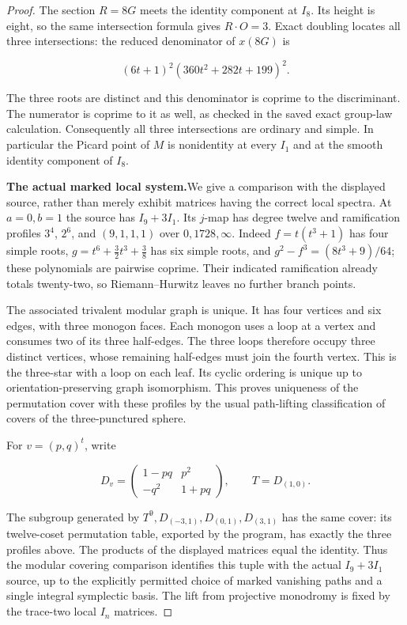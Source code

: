\begin{proof}
The section \(R=8G\) meets the identity component at \(I_8\).
Its height is eight, so the same intersection formula gives
\(R\cdot O=3\).  Exact doubling locates all three intersections:
the reduced denominator of \(x(8G)\) is

\[
 (6t+1)^2(360t^2+282t+199)^2.
\]

The three roots are distinct and this denominator is coprime to
the discriminant.  The numerator is coprime to it as well, as
checked in the saved exact group-law calculation.  Consequently
all three intersections are ordinary and simple.  In particular
the Picard point of \(M\) is nonidentity at every \(I_1\) and
at the smooth identity component of \(I_8\).

\par\medskip\noindent\textbf{The actual marked local system.}\enspace We give a comparison
with the displayed source, rather than merely exhibit matrices
having the correct local spectra.  At \(a=0,b=1\) the source has
\(I_9+3I_1\).  Its \(j\)-map has degree twelve and ramification
profiles \(3^4\), \(2^6\), and \((9,1,1,1)\) over
\(0,1728,\infty\).  Indeed \(f=t(t^3+1)\) has four simple
roots, \(g=t^6+\frac32t^3+\frac38\) has six simple roots,
and \(g^2-f^3=(8t^3+9)/64\); these polynomials are pairwise
coprime.  Their indicated ramification already totals twenty-two,
so Riemann--Hurwitz leaves no further branch points.

The associated trivalent modular graph is unique.  It has four
vertices and six edges, with three monogon faces.  Each monogon
uses a loop at a vertex and consumes two of its three half-edges.
The three loops therefore occupy three distinct vertices, whose
remaining half-edges must join the fourth vertex.  This is the
three-star with a loop on each leaf.  Its cyclic ordering is unique
up to orientation-preserving graph isomorphism.  This proves
uniqueness of the permutation cover with these profiles by the
usual path-lifting classification of covers of the three-punctured
sphere.

For \(v=(p,q)^t\), write

\[
 D_v=\begin{pmatrix}1-pq&p^2\\-q^2&1+pq\end{pmatrix},
 \qquad T=D_{(1,0)}.
\]

The subgroup generated by
\(T^9,D_{(-3,1)},D_{(0,1)},D_{(3,1)}\) has the same cover:
its twelve-coset permutation table, exported by the program, has
exactly the three profiles above.  The products of the displayed
matrices equal the identity.  Thus the modular covering comparison
identifies this tuple with the actual \(I_9+3I_1\) source, up to
the explicitly permitted choice of marked vanishing paths and a
single integral symplectic basis.  The lift from projective
monodromy is fixed by the trace-two local \(I_n\) matrices.


\end{proof}
